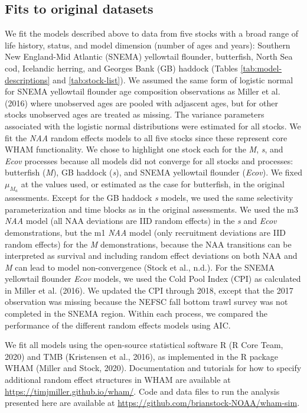 \documentclass[]{article}
\begin{document}
\hypertarget{fits-to-original-datasets}{%
\subsection{Fits to original datasets}\label{fits-to-original-datasets}}

We fit the models described above to data from five stocks with a broad
range of life history, status, and model dimension (number of ages and
years): Southern New England-Mid Atlantic (SNEMA) yellowtail flounder,
butterfish, North Sea cod, Icelandic herring, and Georges Bank (GB)
haddock (Tables \ref{tab:model-descriptions} and \ref{tab:stock-list}).
We assumed the same form of logistic normal for SNEMA yellowtail
flounder age composition observations as Miller et al. (2016) where
unobserved ages are pooled with adjascent ages, but for other stocks
unobserved ages are treated as missing. The variance parameters
associated with the logistic normal distributions were estimated for all
stocks. We fit the \emph{NAA} random effects models to all five stocks
since these represent core WHAM functionality. We chose to highlight one
stock each for the \emph{M}, \emph{s}, and \emph{Ecov} processes because
all models did not converge for all stocks and processes: butterfish
(\emph{M}), GB haddock (\emph{s}), and SNEMA yellowtail flounder
(\emph{Ecov}). We fixed \(\mu_{M_a}\) at the values used, or estimated
as the case for butterfish, in the original assessments. Except for the
GB haddock \emph{s} models, we used the same selectivity
parameterization and time blocks as in the original assessments. We used
the m3 \emph{NAA} model (all NAA deviations are IID random effects) in
the \emph{s} and \emph{Ecov} demonstrations, but the m1 \emph{NAA} model
(only recruitment deviations are IID random effects) for the \emph{M}
demonstrations, because the NAA transitions can be interpreted as
survival and including random effect deviations on both NAA and \emph{M}
can lead to model non-convergence (Stock et al., n.d.). For the SNEMA
yellowtail flounder \emph{Ecov} models, we used the Cold Pool Index
(CPI) as calculated in Miller et al. (2016). We updated the CPI through
2018, except that the 2017 observation was missing because the NEFSC
fall bottom trawl survey was not completed in the SNEMA region. Within
each process, we compared the performance of the different random
effects models using AIC.

We fit all models using the open-source statistical software R (R Core
Team, 2020) and TMB (Kristensen et al., 2016), as implemented in the R
package WHAM (Miller and Stock, 2020). Documentation and tutorials for
how to specify additional random effect structures in WHAM are available
at \url{https://timjmiller.github.io/wham/}. Code and data files to run
the analysis presented here are available at
\url{https://github.com/brianstock-NOAA/wham-sim}.
\end{document}
